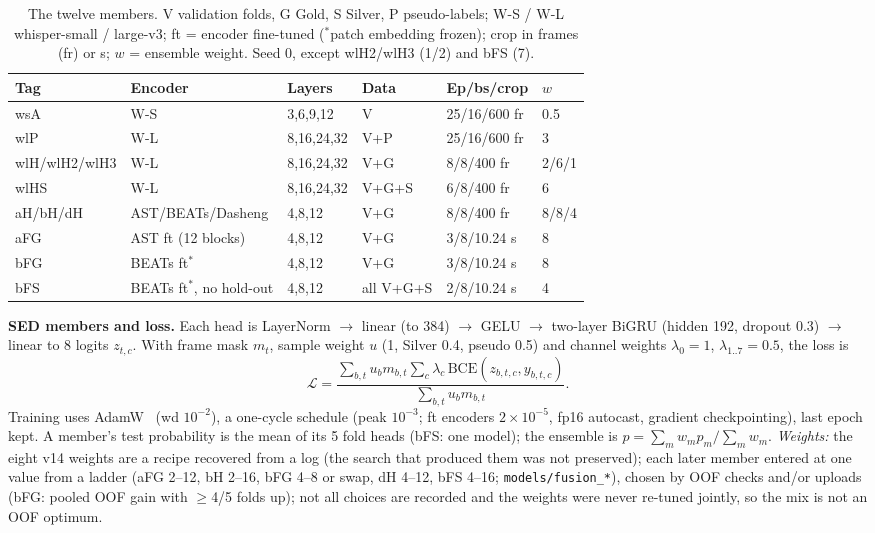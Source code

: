\documentclass[conference]{IEEEtran}
\begin{document}
\begin{table}[t]
\caption{The twelve members. V validation folds, G Gold, S Silver, P pseudo-labels; W-S / W-L whisper-small /
large-v3; ft = encoder fine-tuned ($^{*}$patch embedding frozen); crop in frames (fr) or s; $w$ = ensemble weight.
Seed 0, except wlH2/wlH3 (1/2) and bFS (7).}
\label{tab:members}
\centering
\scriptsize
\setlength{\tabcolsep}{2.5pt}
\begin{tabular}{@{}llllll@{}}
\toprule
Tag & Encoder & Layers & Data & Ep/bs/crop & $w$ \\
\midrule
wsA & W-S & 3,6,9,12 & V & 25/16/600 fr & 0.5 \\
wlP & W-L & 8,16,24,32 & V+P & 25/16/600 fr & 3 \\
wlH/wlH2/wlH3 & W-L & 8,16,24,32 & V+G & 8/8/400 fr & 2/6/1 \\
wlHS & W-L & 8,16,24,32 & V+G+S & 6/8/400 fr & 6 \\
aH/bH/dH & AST/BEATs/Dasheng & 4,8,12 & V+G & 8/8/400 fr & 8/8/4 \\
aFG & AST ft (12 blocks) & 4,8,12 & V+G & 3/8/10.24 s & 8 \\
bFG & BEATs ft$^{*}$ & 4,8,12 & V+G & 3/8/10.24 s & 8 \\
bFS & BEATs ft$^{*}$, no hold-out & 4,8,12 & all V+G+S & 2/8/10.24 s & 4 \\
\bottomrule
\end{tabular}
\end{table}

\textbf{SED members and loss.}\label{sec:sed} Each head is LayerNorm $\rightarrow$ linear (to 384) $\rightarrow$
GELU $\rightarrow$ two-layer BiGRU (hidden 192, dropout 0.3) $\rightarrow$ linear to 8 logits $z_{t,c}$. With
frame mask $m_t$, sample weight $u$ (1, Silver 0.4, pseudo 0.5) and channel weights $\lambda_0=1$,
$\lambda_{1..7}=0.5$, the loss is
\begin{equation}
\mathcal{L}=\frac{\sum_{b,t} u_b m_{b,t}\sum_c \lambda_c\,\mathrm{BCE}(z_{b,t,c},y_{b,t,c})}{\sum_{b,t}u_b m_{b,t}}.
\end{equation}
Training uses AdamW~\cite{adamw} (wd $10^{-2}$), a one-cycle schedule (peak $10^{-3}$; ft encoders
$2\!\times\!10^{-5}$, fp16 autocast, gradient checkpointing), last epoch kept. A member's test probability is the
mean of its 5 fold heads (bFS: one model); the ensemble is $p=\sum_m w_m p_m/\sum_m w_m$. \emph{Weights:} the
eight v14 weights are a recipe recovered from a log (the search that produced them was not preserved); each later
member entered at one value from a ladder (aFG 2--12, bH 2--16, bFG 4--8 or swap, dH 4--12, bFS 4--16;
\texttt{models/fusion\_*}), chosen by OOF checks and/or uploads (bFG: pooled OOF gain with $\ge$4/5 folds up); not
all choices are recorded and the weights were never re-tuned jointly, so the mix is not an OOF optimum.
\end{document}
